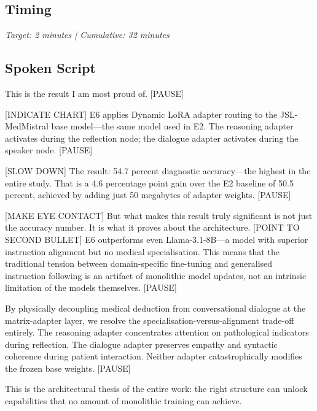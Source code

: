 \subsection*{Timing}
\textit{Target: 2 minutes | Cumulative: 32 minutes}

\subsection*{Spoken Script}
\begin{spokenbox}
 This is the result I am most proud of. [PAUSE]

[INDICATE CHART] E6 applies Dynamic LoRA adapter routing to the JSL-MedMistral base model---the same model used in E2. The reasoning adapter activates during the reflection node; the dialogue adapter activates during the speaker node. [PAUSE]

[SLOW DOWN] The result: 54.7 percent diagnostic accuracy---the highest in the entire study. That is a 4.6 percentage point gain over the E2 baseline of 50.5 percent, achieved by adding just 50 megabytes of adapter weights. [PAUSE]

[MAKE EYE CONTACT] But what makes this result truly significant is not just the accuracy number. It is what it proves about the architecture. [POINT TO SECOND BULLET] E6 outperforms even Llama-3.1-8B---a model with superior instruction alignment but no medical specialisation. This means that the traditional tension between domain-specific fine-tuning and generalised instruction following is an artifact of monolithic model updates, not an intrinsic limitation of the models themselves. [PAUSE]

By physically decoupling medical deduction from conversational dialogue at the matrix-adapter layer, we resolve the specialisation-versus-alignment trade-off entirely. The reasoning adapter concentrates attention on pathological indicators during reflection. The dialogue adapter preserves empathy and syntactic coherence during patient interaction. Neither adapter catastrophically modifies the frozen base weights. [PAUSE]

This is the architectural thesis of the entire work: the right structure can unlock capabilities that no amount of monolithic training can achieve.
\end{spokenbox}

